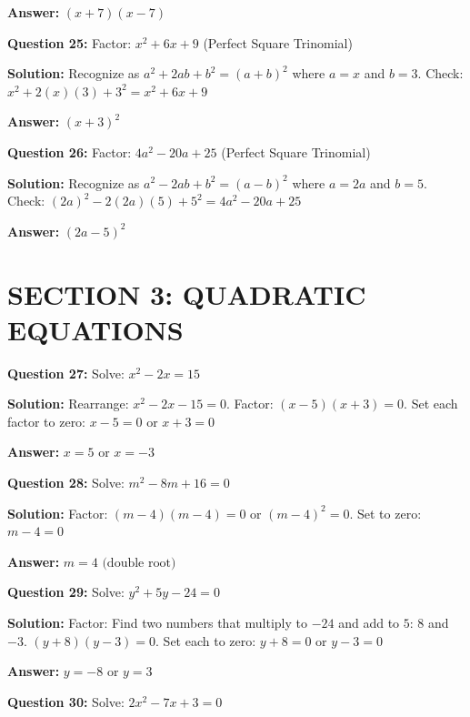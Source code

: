 \documentclass[12pt]{article}
\begin{document}
\textbf{Answer:} $\boxed{(x + 7)(x - 7)}$

\vspace{0.3cm}
\noindent
\textbf{Question 25:} Factor: $x^2 + 6x + 9$ (Perfect Square Trinomial)

\textbf{Solution:} Recognize as $a^2 + 2ab + b^2 = (a + b)^2$ where $a = x$ and $b = 3$. Check: $x^2 + 2(x)(3) + 3^2 = x^2 + 6x + 9$ \checkmark

\textbf{Answer:} $\boxed{(x + 3)^2}$

\vspace{0.3cm}
\noindent
\textbf{Question 26:} Factor: $4a^2 - 20a + 25$ (Perfect Square Trinomial)

\textbf{Solution:} Recognize as $a^2 - 2ab + b^2 = (a - b)^2$ where $a = 2a$ and $b = 5$. Check: $(2a)^2 - 2(2a)(5) + 5^2 = 4a^2 - 20a + 25$ \checkmark

\textbf{Answer:} $\boxed{(2a - 5)^2}$

\hrulefill

\section*{SECTION 3: QUADRATIC EQUATIONS}

\noindent
\textbf{Question 27:} Solve: $x^2 - 2x = 15$

\textbf{Solution:} Rearrange: $x^2 - 2x - 15 = 0$. Factor: $(x - 5)(x + 3) = 0$. Set each factor to zero: $x - 5 = 0$ or $x + 3 = 0$

\textbf{Answer:} $\boxed{x = 5 \text{ or } x = -3}$

\vspace{0.3cm}
\noindent
\textbf{Question 28:} Solve: $m^2 - 8m + 16 = 0$

\textbf{Solution:} Factor: $(m - 4)(m - 4) = 0$ or $(m - 4)^2 = 0$. Set to zero: $m - 4 = 0$

\textbf{Answer:} $\boxed{m = 4 \text{ (double root)}}$

\vspace{0.3cm}
\noindent
\textbf{Question 29:} Solve: $y^2 + 5y - 24 = 0$

\textbf{Solution:} Factor: Find two numbers that multiply to $-24$ and add to $5$: $8$ and $-3$. $(y + 8)(y - 3) = 0$. Set each to zero: $y + 8 = 0$ or $y - 3 = 0$

\textbf{Answer:} $\boxed{y = -8 \text{ or } y = 3}$

\vspace{0.3cm}
\noindent
\textbf{Question 30:} Solve: $2x^2 - 7x + 3 = 0$
\end{document}
